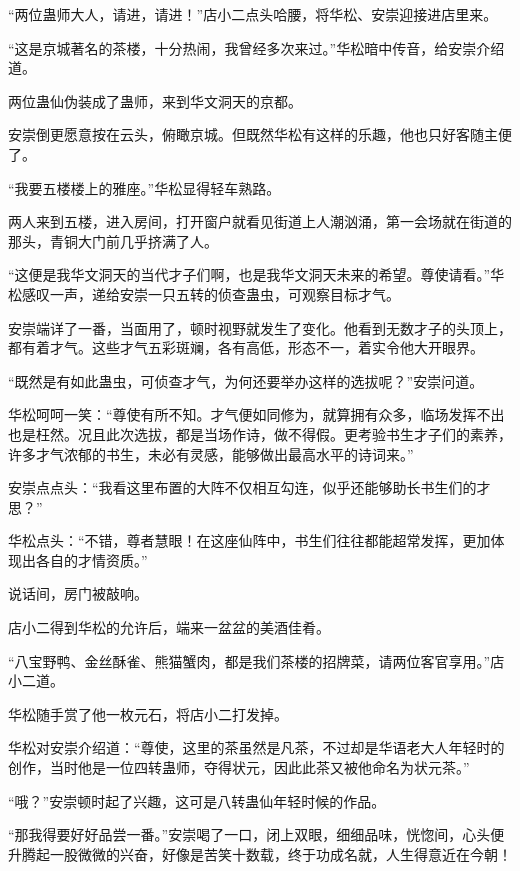 
\begin{this_body}

“两位蛊师大人，请进，请进！”店小二点头哈腰，将华松、安崇迎接进店里来。

“这是京城著名的茶楼，十分热闹，我曾经多次来过。”华松暗中传音，给安崇介绍道。

两位蛊仙伪装成了蛊师，来到华文洞天的京都。

安崇倒更愿意按在云头，俯瞰京城。但既然华松有这样的乐趣，他也只好客随主便了。

“我要五楼楼上的雅座。”华松显得轻车熟路。

两人来到五楼，进入房间，打开窗户就看见街道上人潮汹涌，第一会场就在街道的那头，青铜大门前几乎挤满了人。

“这便是我华文洞天的当代才子们啊，也是我华文洞天未来的希望。尊使请看。”华松感叹一声，递给安崇一只五转的侦查蛊虫，可观察目标才气。

安崇端详了一番，当面用了，顿时视野就发生了变化。他看到无数才子的头顶上，都有着才气。这些才气五彩斑斓，各有高低，形态不一，着实令他大开眼界。

“既然是有如此蛊虫，可侦查才气，为何还要举办这样的选拔呢？”安崇问道。

华松呵呵一笑：“尊使有所不知。才气便如同修为，就算拥有众多，临场发挥不出也是枉然。况且此次选拔，都是当场作诗，做不得假。更考验书生才子们的素养，许多才气浓郁的书生，未必有灵感，能够做出最高水平的诗词来。”

安崇点点头：“我看这里布置的大阵不仅相互勾连，似乎还能够助长书生们的才思？”

华松点头：“不错，尊者慧眼！在这座仙阵中，书生们往往都能超常发挥，更加体现出各自的才情资质。”

说话间，房门被敲响。

店小二得到华松的允许后，端来一盆盆的美酒佳肴。

“八宝野鸭、金丝酥雀、熊猫蟹肉，都是我们茶楼的招牌菜，请两位客官享用。”店小二道。

华松随手赏了他一枚元石，将店小二打发掉。

华松对安崇介绍道：“尊使，这里的茶虽然是凡茶，不过却是华语老大人年轻时的创作，当时他是一位四转蛊师，夺得状元，因此此茶又被他命名为状元茶。”

“哦？”安崇顿时起了兴趣，这可是八转蛊仙年轻时候的作品。

“那我得要好好品尝一番。”安崇喝了一口，闭上双眼，细细品味，恍惚间，心头便升腾起一股微微的兴奋，好像是苦笑十数载，终于功成名就，人生得意近在今朝！


\end{this_body}
